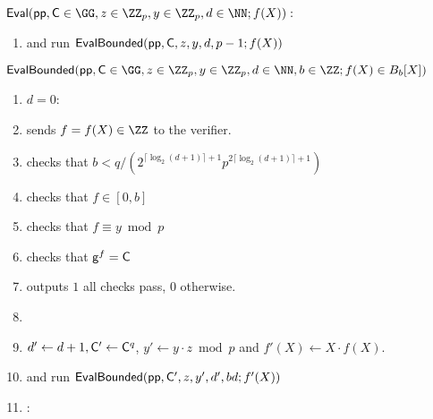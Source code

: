 \documentclass{article}
\theoremstyle{definition}
\begin{document}


\begin{mdframed}
\begin{minipage}{\textwidth}
			$\pro{Eval}(\crs, \gr{C}\in \GG, z\in \ZZ_p, y\in \ZZ_p, d \in \NN; f(X)) :$ 
			\begin{enumerate}[nolistsep]
			\item \prover and \verifier run $\textsf{{EvalBounded}}(\textsf{pp},\mathsf{C},z,y,d,p-1;f(X))$
		    \end{enumerate}
		$\pro{EvalBounded}(\crs,\gr{C}\in \GG,z\in \ZZ_p,y\in \ZZ_p,d\in \NN,b\in \ZZ;f(X)\in B_{b}[X])$
	    \begin{enumerate}[nolistsep]
        \item \pcif $d=0$:
        \item \pcind[1] \prover sends $f=f(X)\in \ZZ$ to the verifier. 
        \item \pcind[1] \verifier checks that $b< q/(2^{\lceil \log_2(d+1) \rceil+1} p^{2 \lceil \log_2(d+1) \rceil+1})$
        \item \pcind[1] \verifier checks that $f \in [0,b]$
          \item \pcind[1] \verifier checks that $f\equiv y \bmod p$
                \item \pcind[1] \verifier checks that $\mathsf{g}^{f}=\mathsf{C}$
\item \pcind[1] \verifier outputs $1$ \pcif all checks pass, $0$ otherwise.
          \item {}
         \item \pcind[1]  $d'\gets d+1, \mathsf{C}'\gets \mathsf{C}^q$, $y'\gets y\cdot z \bmod p$ and $f'(X)\gets X \cdot f(X)$.
         \item \pcind[1] \prover and \verifier run $\textsf{{EvalBounded}}(\textsf{pp},\mathsf{C}',z,y',d',bd;f'(X))$

        \item \pcelse: 
       

\end{enumerate}
\end{minipage}
\end{mdframed}
\end{document}
